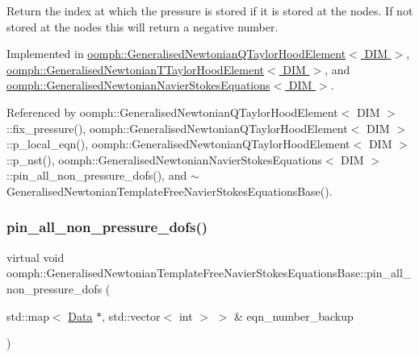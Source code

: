Return the index at which the pressure is stored if it is stored at the nodes. If not stored at the nodes this will return a negative number. 



Implemented in \hyperlink{classoomph_1_1GeneralisedNewtonianQTaylorHoodElement_a1100787d48487bdb1ca3201b49c9c41f}{oomph\+::\+Generalised\+Newtonian\+Q\+Taylor\+Hood\+Element$<$ D\+I\+M $>$}, \hyperlink{classoomph_1_1GeneralisedNewtonianTTaylorHoodElement_af1aacc302260ae8d987bc48b560304f5}{oomph\+::\+Generalised\+Newtonian\+T\+Taylor\+Hood\+Element$<$ D\+I\+M $>$}, and \hyperlink{classoomph_1_1GeneralisedNewtonianNavierStokesEquations_aae2c43cb69c84108e838b5aec8bd2a4b}{oomph\+::\+Generalised\+Newtonian\+Navier\+Stokes\+Equations$<$ D\+I\+M $>$}.



Referenced by oomph\+::\+Generalised\+Newtonian\+Q\+Taylor\+Hood\+Element$<$ D\+I\+M $>$\+::fix\+\_\+pressure(), oomph\+::\+Generalised\+Newtonian\+Q\+Taylor\+Hood\+Element$<$ D\+I\+M $>$\+::p\+\_\+local\+\_\+eqn(), oomph\+::\+Generalised\+Newtonian\+Q\+Taylor\+Hood\+Element$<$ D\+I\+M $>$\+::p\+\_\+nst(), oomph\+::\+Generalised\+Newtonian\+Navier\+Stokes\+Equations$<$ D\+I\+M $>$\+::pin\+\_\+all\+\_\+non\+\_\+pressure\+\_\+dofs(), and $\sim$\+Generalised\+Newtonian\+Template\+Free\+Navier\+Stokes\+Equations\+Base().

\mbox{\label{classoomph_1_1GeneralisedNewtonianTemplateFreeNavierStokesEquationsBase_ae5b2fd78047630a2be4d66c541184a46}} 
\subsubsection{\texorpdfstring{pin\+\_\+all\+\_\+non\+\_\+pressure\+\_\+dofs()}{pin\_all\_non\_pressure\_dofs()}}
{\footnotesize\ttfamily virtual void oomph\+::\+Generalised\+Newtonian\+Template\+Free\+Navier\+Stokes\+Equations\+Base\+::pin\+\_\+all\+\_\+non\+\_\+pressure\+\_\+dofs (\begin{DoxyParamCaption}\item[{std\+::map$<$ \hyperlink{classoomph_1_1Data}{Data} $\ast$, std\+::vector$<$ int $>$ $>$ \&}]{eqn\+\_\+number\+\_\+backup }\end{DoxyParamCaption})\hspace{0.3cm}{\ttfamily [pure virtual]}}



